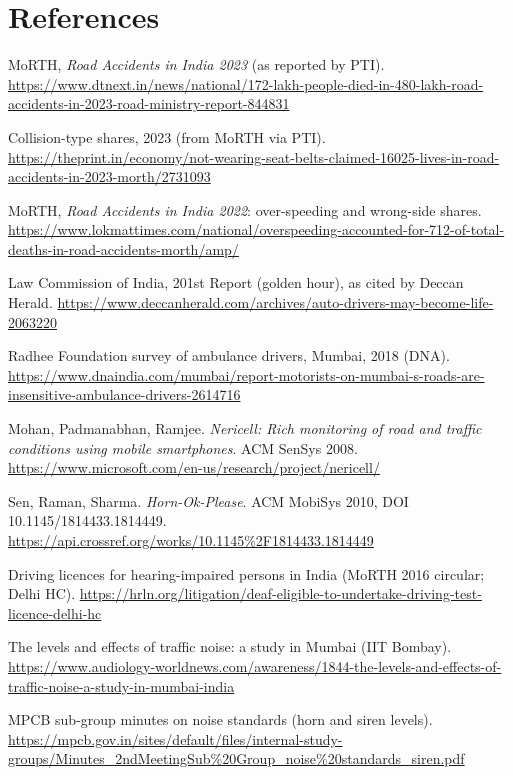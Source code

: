 \documentclass[11pt]{article}
\begin{document}
\section{References}
{\small
\begin{description}[leftmargin=1.2cm,style=nextline,itemsep=2pt]
\item[R1] MoRTH, \emph{Road Accidents in India 2023} (as reported by PTI). \url{https://www.dtnext.in/news/national/172-lakh-people-died-in-480-lakh-road-accidents-in-2023-road-ministry-report-844831}
\item[R2] Collision-type shares, 2023 (from MoRTH via PTI). \url{https://theprint.in/economy/not-wearing-seat-belts-claimed-16025-lives-in-road-accidents-in-2023-morth/2731093}
\item[R3] MoRTH, \emph{Road Accidents in India 2022}: over-speeding and wrong-side shares. \url{https://www.lokmattimes.com/national/overspeeding-accounted-for-712-of-total-deaths-in-road-accidents-morth/amp/}
\item[R4] Law Commission of India, 201st Report (golden hour), as cited by Deccan Herald. \url{https://www.deccanherald.com/archives/auto-drivers-may-become-life-2063220}
\item[R5] Radhee Foundation survey of ambulance drivers, Mumbai, 2018 (DNA). \url{https://www.dnaindia.com/mumbai/report-motorists-on-mumbai-s-roads-are-insensitive-ambulance-drivers-2614716}
\item[R6] Mohan, Padmanabhan, Ramjee. \emph{Nericell: Rich monitoring of road and traffic conditions using mobile smartphones}. ACM SenSys 2008. \url{https://www.microsoft.com/en-us/research/project/nericell/}
\item[R7] Sen, Raman, Sharma. \emph{Horn-Ok-Please}. ACM MobiSys 2010, DOI 10.1145/1814433.1814449. \url{https://api.crossref.org/works/10.1145\%2F1814433.1814449}
\item[R8] Driving licences for hearing-impaired persons in India (MoRTH 2016 circular; Delhi HC). \url{https://hrln.org/litigation/deaf-eligible-to-undertake-driving-test-licence-delhi-hc}
\item[R9] The levels and effects of traffic noise: a study in Mumbai (IIT Bombay). \url{https://www.audiology-worldnews.com/awareness/1844-the-levels-and-effects-of-traffic-noise-a-study-in-mumbai-india}
\item[R10] MPCB sub-group minutes on noise standards (horn and siren levels). \url{https://mpcb.gov.in/sites/default/files/internal-study-groups/Minutes_2ndMeetingSub\%20Group_noise\%20standards_siren.pdf}

\end{description}}
\end{document}
